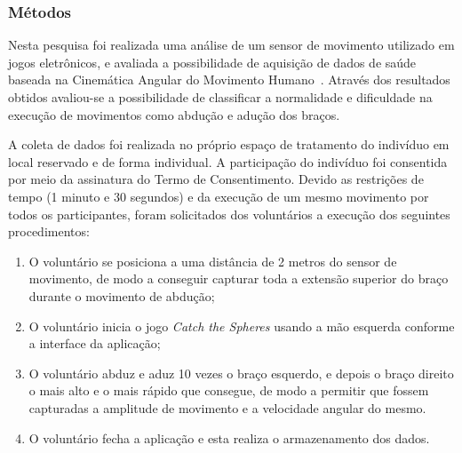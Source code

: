 %

\subsubsection{Métodos}
Nesta pesquisa foi realizada uma análise de um sensor de movimento utilizado em jogos eletrônicos, e avaliada a possibilidade de aquisição de dados de saúde baseada na Cinemática Angular do Movimento Humano~\cite{hamill1999bases}.  Através dos resultados obtidos avaliou-se a possibilidade de classificar a normalidade e dificuldade na execução de movimentos como abdução e adução dos braços.

A coleta de dados foi realizada no próprio espaço de tratamento do indivíduo em local reservado e de forma individual. A participação do indivíduo foi consentida por meio da assinatura do Termo de Consentimento. Devido as restrições de tempo (1 minuto e 30 segundos) e da execução de um mesmo movimento por todos os participantes, foram solicitados dos voluntários a execução dos seguintes procedimentos:
\begin{enumerate}
	\item O voluntário se posiciona a uma distância de 2 metros do sensor de movimento, de modo a conseguir capturar toda a extensão superior do braço durante o movimento de abdução; 	
	\item O voluntário inicia o jogo \textit{Catch the Spheres} usando a mão esquerda conforme a interface da aplicação;
	\item O voluntário abduz e aduz 10 vezes o braço esquerdo, e depois o braço direito o mais alto e o mais rápido que consegue, de modo a permitir que fossem capturadas a amplitude de movimento e a velocidade angular do mesmo. 
	\item O voluntário fecha a aplicação e esta realiza o armazenamento dos dados.
\end{enumerate}

